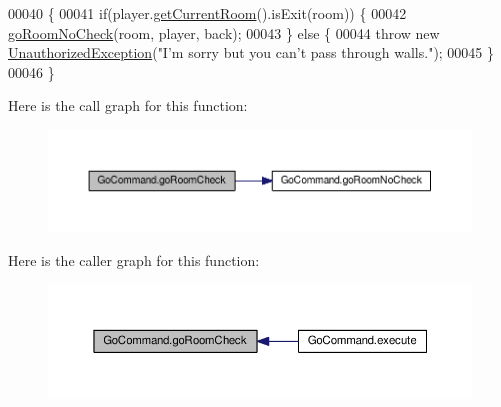 \begin{DoxyCode}
00040                                                                                                            
                        \{
00041         \textcolor{keywordflow}{if}(player.\hyperlink{classPlayer_a3a3107df50fc4e35e8c0f46c3f776ce6}{getCurrentRoom}().isExit(room)) \{
00042             \hyperlink{classGoCommand_a3149bf695c19b78c39cfc4dadece7846}{goRoomNoCheck}(room, player, back);
00043         \} \textcolor{keywordflow}{else} \{
00044             \textcolor{keywordflow}{throw} \textcolor{keyword}{new} \hyperlink{classUnauthorizedException}{UnauthorizedException}(\textcolor{stringliteral}{"I'm sorry but you can't pass through
       walls."});
00045         \}
00046     \}
\end{DoxyCode}


Here is the call graph for this function\-:
\nopagebreak
\begin{figure}[H]
\begin{center}
\leavevmode
\includegraphics[width=350pt]{classGoCommand_a1fce2ad8ed1faf41fa300064585b3616_cgraph}
\end{center}
\end{figure}




Here is the caller graph for this function\-:
\nopagebreak
\begin{figure}[H]
\begin{center}
\leavevmode
\includegraphics[width=350pt]{classGoCommand_a1fce2ad8ed1faf41fa300064585b3616_icgraph}
\end{center}
\end{figure}


